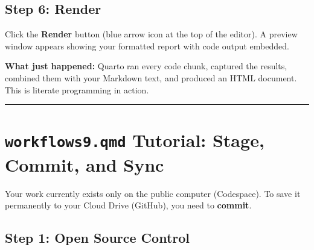 \documentclass[
  letterpaper,
  DIV=11,
  numbers=noendperiod,
  oneside]{scrreprt}
\begin{document}
\subsection*{Step 6: Render}\label{step-6-render}

Click the \textbf{Render} button (blue arrow icon at the top of the
editor). A preview window appears showing your formatted report with
code output embedded.

\begin{tcolorbox}[enhanced jigsaw, opacitybacktitle=0.6, colbacktitle=quarto-callout-tip-color!10!white, breakable, opacityback=0, coltitle=black, toptitle=1mm, bottomrule=.15mm, colframe=quarto-callout-tip-color-frame, bottomtitle=1mm, colback=white, leftrule=.75mm, rightrule=.15mm, title=\textcolor{quarto-callout-tip-color}{\faLightbulb}\hspace{0.5em}{Tip}, left=2mm, arc=.35mm, toprule=.15mm, titlerule=0mm]

\textbf{What just happened:} Quarto ran every code chunk, captured the
results, combined them with your Markdown text, and produced an HTML
document. This is literate programming in action.

\end{tcolorbox}

\begin{center}\rule{0.5\linewidth}{0.5pt}\end{center}

\section*{\texorpdfstring{\texttt{workflows9.qmd} Tutorial: Stage,
Commit, and
Sync}{workflows9.qmd Tutorial: Stage, Commit, and Sync}}\label{workflows9.qmd-tutorial-stage-commit-and-sync}


Your work currently exists only on the public computer (Codespace). To
save it permanently to your Cloud Drive (GitHub), you need to
\textbf{commit}.

\subsection*{Step 1: Open Source
Control}\label{step-1-open-source-control}
\end{document}
